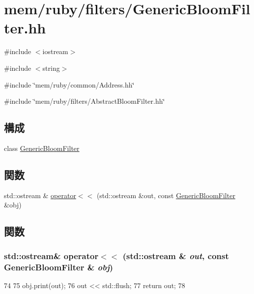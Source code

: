 \hypertarget{GenericBloomFilter_8hh}{
\section{mem/ruby/filters/GenericBloomFilter.hh}
\label{GenericBloomFilter_8hh}
}
{\ttfamily \#include $<$iostream$>$}\par
{\ttfamily \#include $<$string$>$}\par
{\ttfamily \#include \char`\"{}mem/ruby/common/Address.hh\char`\"{}}\par
{\ttfamily \#include \char`\"{}mem/ruby/filters/AbstractBloomFilter.hh\char`\"{}}\par
\subsection*{構成}
\begin{DoxyCompactItemize}
\item 
class \hyperlink{classGenericBloomFilter}{GenericBloomFilter}
\end{DoxyCompactItemize}
\subsection*{関数}
\begin{DoxyCompactItemize}
\item 
std::ostream \& \hyperlink{GenericBloomFilter_8hh_a60dc3eedd38c80a14762071a9b681b0f}{operator$<$$<$} (std::ostream \&out, const \hyperlink{classGenericBloomFilter}{GenericBloomFilter} \&obj)
\end{DoxyCompactItemize}


\subsection{関数}
\hypertarget{GenericBloomFilter_8hh_a60dc3eedd38c80a14762071a9b681b0f}{
\subsubsection[{operator$<$$<$}]{\setlength{\rightskip}{0pt plus 5cm}std::ostream\& operator$<$$<$ (std::ostream \& {\em out}, \/  const {\bf GenericBloomFilter} \& {\em obj})}}
\label{GenericBloomFilter_8hh_a60dc3eedd38c80a14762071a9b681b0f}



\begin{DoxyCode}
74 {
75     obj.print(out);
76     out << std::flush;
77     return out;
78 }
\end{DoxyCode}
